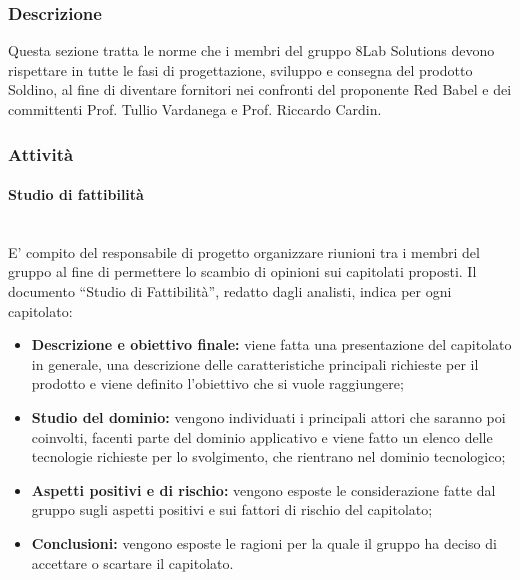 \begin{itemize}
\subsubsection{Descrizione}
Questa sezione tratta le norme che i membri del gruppo 8Lab Solutions devono rispettare in tutte le fasi di progettazione, sviluppo e consegna del prodotto Soldino, al fine di diventare fornitori nei confronti del proponente Red Babel e dei committenti Prof. Tullio Vardanega e Prof. Riccardo Cardin.
\subsubsection{Attività}
\paragraph{Studio di fattibilità} \mbox{}\\ 
E' compito del responsabile di progetto organizzare riunioni tra i membri del gruppo al fine di permettere lo scambio di opinioni sui capitolati proposti.
Il documento ``Studio di Fattibilità'', redatto dagli analisti, indica per ogni capitolato:
\begin{itemize}
	\item \textbf{Descrizione e obiettivo finale:} viene fatta una presentazione del capitolato in generale, una descrizione delle caratteristiche principali richieste per il prodotto e viene definito l'obiettivo che si vuole raggiungere;
	\item \textbf{Studio del dominio:} vengono individuati i principali attori che saranno poi coinvolti, facenti parte del dominio applicativo e viene fatto un elenco delle tecnologie richieste per lo svolgimento, che rientrano nel dominio tecnologico;
	\item \textbf{Aspetti positivi e di rischio:} vengono esposte le considerazione fatte dal gruppo sugli aspetti positivi e sui fattori di rischio del capitolato;
	\item \textbf{Conclusioni:} vengono esposte le ragioni per la quale il gruppo ha deciso di accettare o scartare il capitolato.
\end{itemize}

\end{itemize}
